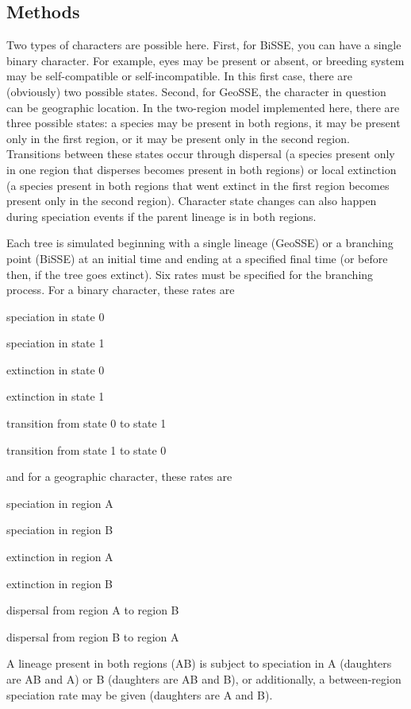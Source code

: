 \documentclass[10pt]{article}
\begin{document}
\subsection*{Methods}

Two types of characters are possible here.
First, for BiSSE, you can have a single binary character.
For example, eyes may be present or absent, or breeding system may be self-compatible or self-incompatible.
In this first case, there are (obviously) two possible states.
Second, for GeoSSE, the character in question can be geographic location.
In the two-region model implemented here, there are three possible states: a species may be present in both regions, it may be present only in the first region, or it may be present only in the second region.
Transitions between these states occur through dispersal (a species present only in one region that disperses becomes present in both regions) or local extinction (a species present in both regions that went extinct in the first region becomes present only in the second region).
Character state changes can also happen during speciation events if the parent lineage is in both regions.

Each tree is simulated beginning with a single lineage (GeoSSE) or a branching point (BiSSE) at an initial time and ending at a specified final time (or before then, if the tree goes extinct).
Six rates must be specified for the branching process.
For a binary character, these rates are
\begin{tightlist}
\item speciation in state 0
\item speciation in state 1
\item extinction in state 0
\item extinction in state 1
\item transition from state 0 to state 1
\item transition from state 1 to state 0
\end{tightlist}
and for a geographic character, these rates are
\begin{tightlist}
\item speciation in region A
\item speciation in region B
\item extinction in region A
\item extinction in region B
\item dispersal from region A to region B
\item dispersal from region B to region A
\end{tightlist}
A lineage present in both regions (AB) is subject to speciation in A (daughters are AB and A) or B (daughters are AB and B), or additionally, a between-region speciation rate may be given (daughters are A and B).
\end{document}
